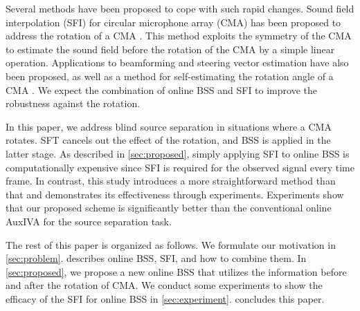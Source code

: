 \documentclass[sip,biber]{now-journal}
\begin{document}
Several methods have been proposed to cope with such rapid changes.
Sound field interpolation (SFI) for circular microphone array (CMA) has been proposed to address the rotation of a CMA \cite{Wakabayashi:2023:ASLP}.
This method exploits the symmetry of the CMA to estimate the sound field before the rotation of the CMA by a simple linear operation.
Applications to beamforming \cite{Wakabayashi:2021:ICASSP} and steering vector estimation \cite{Wakabayashi:2021:ASJ:A} have also been proposed,
as well as a method for self-estimating the rotation angle of a CMA \cite{Lian:2021:APSIPA}.
We expect the combination of online BSS and SFI to improve the robustness against the rotation.

In this paper, we address blind source separation in situations where a CMA rotates.
SFT cancels out the effect of the rotation, and BSS is applied in the latter stage.
As described in \cref{sec:proposed}, simply applying SFI to online BSS is computationally expensive since SFI is required for the observed signal every time frame.
In contrast, this study introduces a more straightforward method than that and demonstrates its effectiveness through experiments.
Experiments show that our proposed scheme is significantly better than the conventional online AuxIVA for the source separation task.

The rest of this paper is organized as follows.
We formulate our motivation in \cref{sec:problem}.
 describes online BSS, SFI, and how to combine them.
In \cref{sec:proposed}, we propose a new online BSS that utilizes the information before and after the rotation of CMA.
We conduct some experiments to show the efficacy of the SFI for online BSS in \cref{sec:experiment}.
 concludes this paper.
\end{document}
